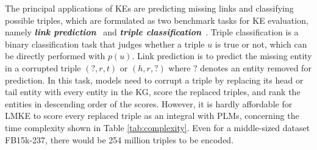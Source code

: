 \documentclass{article}
\begin{document}
The principal applications of KEs are predicting missing links and classifying possible triples, which are formulated as two benchmark tasks for KE evaluation, namely \textbf{\textit{link prediction}}~\cite{bordes2013transe} and \textbf{\textit{triple classification}}~\cite{socher2013ntn}.
Triple classification is a binary classification task that judges whether a triple $u$ is true or not, which can be directly performed with  $p(u)$.
Link prediction is to predict the missing entity in a corrupted triple $(?, r, t)$ or $(h, r, ?)$ where $?$ denotes an entity removed for prediction. 
In this task, models need to corrupt a triple by replacing its head or tail entity with every entity in the KG, score the replaced triples, and rank the entities in descending order of the scores.
However, it is hardly affordable for LMKE to score every replaced triple as an integral with PLMs, concerning the time complexity shown in Table \ref{tab:complexity}. 
Even for a middle-sized dataset FB15k-237, there would be 254 million triples to be encoded. 




\begin{table}[htbp]
    \small
    \centering
{}
    \caption{The time complexity of training and link prediction evaluation. 
    $|\mathcal{E}|$ or $|\mathcal{R}|$ denotes the number of entities or relations in the KG. 
    $N_{\text{train}}$ or $N_{\text{eval}}$ is the number of triples in the training or evaluation split. $N_{\text{neg}}$ is the negative sampling size. C-LMKE denotes contrastive LMKE, whose complexity is lower than prior approaches.}
    \label{tab:complexity}
\end{table}
\end{document}
